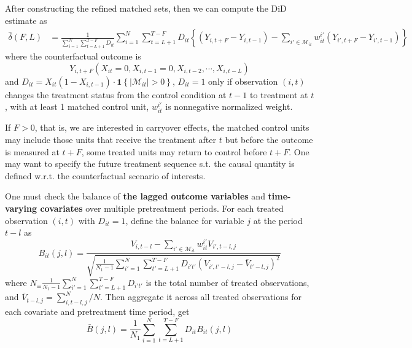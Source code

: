 \documentclass[twoside]{article}
\begin{document}
After constructing the refined matched sets, then we can compute the DiD estimate as 
\begin{align*}
    \hat{\delta}\left(F,L\right) &= \frac{1}{\sum^N_{i=1}\sum^{T-F}_{t=L+1}D_{it}}\sum^N_{i=1}\sum^{T-F}_{t=L+1}D_{it} \left\{ \left(Y_{i,t+F}-Y_{i,t-1} \right) - \sum_{i'\in\mathcal{M}_{it}}w^{i'}_{it}\left(Y_{i',t+F}-Y_{i',t-1}\right) \right\}
\end{align*}
where the counterfactual outcome is $$ Y_{i,t+F}\left(X_{it}=0,X_{i,t-1}=0,X_{i,t-2},\cdots,X_{i,t-L}\right) $$
and $D_{it}=X_{it}\left(1-X_{i,t-1}\right)\cdot \mathbf{1}\left\{\left\vert \mathcal{M}_{it} \right\vert>0\right\}$, $D_{it}=1$ only if observation $(i,t)$ changes the treatment status from the control condition at $t-1$ to treatment at $t$, with at least 1 matched control unit, $w^{i'}_{it}$ is nonnegative normalized weight.

If $F>0$, that is, we are interested in carryover effects, the matched control units may include those units that receive the treatment after $t$ but before the outcome is measured at $t+F$, some treated units may return to control before $t+F$. One may want to specify the future treatment sequence s.t. the causal quantity is defined w.r.t. the counterfactual scenario of interests.

One must check the balance of \textbf{the lagged outcome variables} and \textbf{time-varying covariates} over multiple pretreatment periods. For each treated observation $(i,t)$ with $D_{it}=1$, define the balance for variable $j$ at the period $t-l$ as 
\begin{equation*}
    B_{it}\left(j,l\right) = \frac{ V_{i,t-l} -\sum_{i'\in\mathcal{M}_{it}} w^{i'}_{it}V_{i',t-l,j} }{ \sqrt{ \frac{1}{N_1-1} \sum^N_{i'=1}\sum^{T-F}_{t'=L+1}D_{i't'}\left(V_{i',t'-l,j} - \bar{V}_{t'-l,j} \right)^2 } }
\end{equation*}
where $N_\equiv \frac{1}{N_1-1} \sum^N_{i'=1}\sum^{T-F}_{t'=L+1}D_{i't'}$ is the total number of treated observations, and $\bar{V}_{t-l,j}=\sum^N_{i,t-l,j}/N$. Then aggregate it across all treated observations for each covariate and pretreatment time period, get 
\begin{equation*}
    \bar{B} \left(j,l\right) = \frac{1}{N_1} \sum^N_{i=1} \sum^{T-F}_{t=L+1} D_{it} B_{it} (j,l)
\end{equation*}
\end{document}
